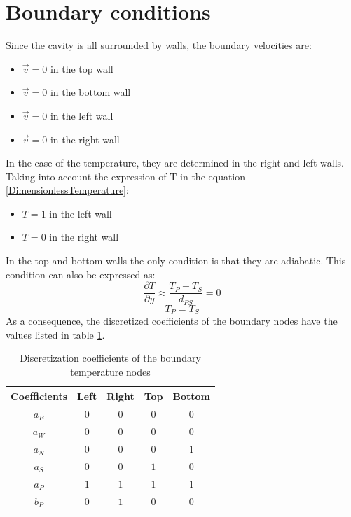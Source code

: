 \section{Boundary conditions}
Since the cavity is all surrounded by walls, the boundary velocities are:
\begin{itemize}
	\item $\vec{v}=0$ in the top wall
	\item $\vec{v}=0$ in the bottom wall
	\item $\vec{v}=0$ in the left wall
	\item $\vec{v}=0$ in the right wall
\end{itemize}
In the case of the temperature, they are determined in the right and left walls. Taking into account the expression of T in the equation \ref{DimensionlessTemperature}:
\begin{itemize}
	\item $T=1$ in the left wall
	\item $T=0$ in the right wall
\end{itemize}
In the top and bottom walls the only condition is that they are adiabatic. This condition can also be expressed as:
\begin{equation}
\frac{\partial T}{\partial y}\approx\frac{T_{P}-T_{S}}{d_{PS}}=0
\end{equation}
\begin{equation}
T_{P}=T_{S}
\end{equation}
As a consequence, the discretized coefficients of the boundary nodes have the values listed in table \ref{BoundTempDiffHeat}.
\begin{table}[h]
	\centering\begin{tabular}{ |c|c|c|c|c| }
		\hline
		Coefficients & Left & Right & Top & Bottom \\ \hline
		$a_{E}$ & $0$ & $0$ & $0$ & $0$ \\ \hline
		$a_{W}$ & $0$ & $0$ & $0$ & $0$ \\ \hline
		$a_{N}$ & $0$ & $0$ & $0$ & $1$ \\ \hline
		$a_{S}$ & $0$ & $0$ & $1$ & $0$ \\ \hline
		$a_{P}$ & $1$ & $1$ & $1$ & $1$ \\ \hline
		$b_{P}$ & $0$ & $1$ & $0$ & $0$ \\ \hline
	\end{tabular}
\caption{Discretization coefficients of the boundary temperature nodes}
\label{BoundTempDiffHeat}
\end{table}


